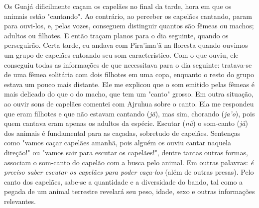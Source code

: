 Os Guajá dificilmente caçam os capelães no final da tarde, hora em que
os animais estão "cantando". Ao contrário, ao perceber os capelães
cantando, param para ouvi-los, e, pelas vozes, conseguem distinguir
quantos são fêmeas ou machos; adultos ou filhotes. E então traçam planos
para o dia seguinte, quando os perseguirão. Certa tarde, eu andava com
Pira'ima'ã na floresta quando ouvimos um grupo de capelães entoando seu
som característico. Com o que ouviu, ele conseguiu todas as informações
de que necessitava para o dia seguinte: tratava-se de uma fêmea
solitária com dois filhotes em uma copa, enquanto o resto do grupo
estava um pouco mais distante. Ele me explicou que o som emitido pelas
fêmeas é mais delicado do que o do macho, que tem um "canto" grosso. Em
outra situação, ao ouvir sons de capelães comentei com Ajruhua sobre o
canto. Ela me respondeu que eram filhotes e que não estavam cantando
(\emph{jã}), mas sim, chorando (\emph{ja'o}), pois quem cantava eram
apenas os adultos da espécie. Escutar (\emph{nũ}) o som-canto
(\emph{jã}) dos animais é fundamental para as caçadas, sobretudo de
capelães. Sentenças como "vamos caçar capelães amanhã, pois alguém os
ouviu cantar naquela direção!" ou "vamos sair para escutar os
capelães!", dentre tantas outras formas, associam o som-canto do capelão
com a busca pelo animal. Em outras palavras: \emph{é preciso saber
escutar os capelães para poder caça-los} (além de outras presas). Pelo
canto dos capelães, sabe-se a quantidade e a diversidade do bando, tal
como a pegada de um animal terrestre revelará seu peso, idade, sexo e
outras informações relevantes.


